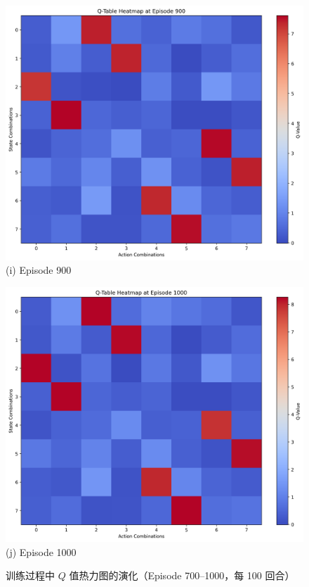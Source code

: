 \begin{figure}[htbp]
    \vspace{0.5em}
    \begin{minipage}{0.45\textwidth}
        \includegraphics[width=\linewidth]{figure/multi_switch/q_heatmap_episode_900.png}
        \centering (i) Episode 900
    \end{minipage}
    \hfill
    \begin{minipage}{0.45\textwidth}
        \includegraphics[width=\linewidth]{figure/multi_switch/q_heatmap_episode_1000.png}
        \centering (j) Episode 1000
    \end{minipage}

    \caption{训练过程中 \(Q\) 值热力图的演化（Episode 700–1000，每 100 回合）}
\end{figure}

